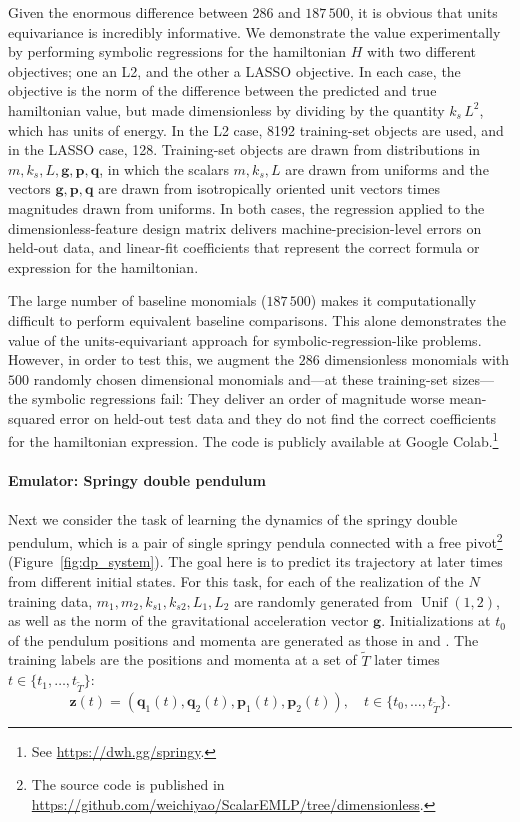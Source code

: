 \documentclass[twoside,11pt]{article}
\DeclareMathOperator{\Unif}{Unif}
\begin{document}
Given the enormous difference between $286$ and $187\,500$, it is obvious that units equivariance is incredibly informative.
We demonstrate the value experimentally by performing symbolic regressions for the hamiltonian $H$ with two different objectives; one an L2, and the other a LASSO objective.
In each case, the objective is the norm of the difference between the predicted and true hamiltonian value, but made dimensionless by dividing by the quantity $k_s\,L^2$, which has units of energy.
In the L2 case, 8192 training-set objects are used, and in the LASSO case, 128.
Training-set objects are drawn from distributions in $m, k_s, L, \mathbf{g}, \mathbf{p}, \mathbf{q}$, in which the scalars $m, k_s, L$ are drawn from uniforms and the vectors $\mathbf{g}, \mathbf{p}, \mathbf{q}$ are drawn from isotropically oriented unit vectors times magnitudes drawn from uniforms.
In both cases, the regression applied to the dimensionless-feature design matrix delivers machine-precision-level errors on held-out data, and linear-fit coefficients that represent the correct formula or expression for the hamiltonian.

The large number of baseline monomials ($187\,500$) makes it computationally difficult to perform equivalent baseline comparisons. %
This alone demonstrates the value of the units-equivariant approach for symbolic-regression-like problems.
However, in order to test this, we augment the $286$ dimensionless monomials with $500$ randomly chosen dimensional monomials and---at these training-set sizes---the symbolic regressions fail:
They deliver an order of magnitude worse mean-squared error on held-out test data and they do not find the correct coefficients for the hamiltonian expression.
The code is publicly available at Google Colab.\footnote{See \url{https://dwh.gg/springy}.}

\paragraph{Emulator: Springy double pendulum}
Next we consider the task of learning the dynamics of the springy double pendulum, which is a pair of single springy pendula connected with a free pivot\footnote{The source code is published in \url{https://github.com/weichiyao/ScalarEMLP/tree/dimensionless}.} (Figure~\ref{fig:dp_system}).
The goal here is to predict its trajectory at later times from different initial states.
For this task, for each of the realization of the $N$ training data, $m_1, m_2, k_{s1}, k_{s2}, L_1, L_2$ are randomly generated from $\Unif(1,2)$, as well as the norm of the gravitational acceleration vector $\mathbf{g}$. Initializations at $t_0$ of the pendulum positions and momenta are generated as those in \citet{finzi} and \citet{yao}. 
The training labels are the positions and momenta at a set of $\tilde{T}$ later times $t\in\{t_1,\ldots,t_{\tilde{T}}\}$:
\begin{equation}
\mathbf{z}(t)=(\mathbf{q}_1(t),\mathbf{q}_2(t),\mathbf{p}_1(t),\mathbf{p}_2(t)), \quad t\in\{t_0, \ldots,t_{\tilde{T}}\}. \label{eq.training}
\end{equation}  
\end{document}
